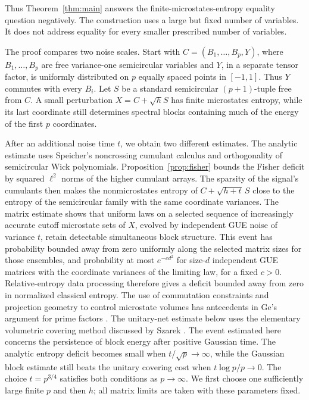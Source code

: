 Thus Theorem~\ref{thm:main} answers the finite-microstates-entropy
equality question negatively. The construction uses a large but fixed number of
variables. It does not address equality for every smaller prescribed
number of variables.

The proof compares two noise scales. Start with
$C=(B_1,\ldots,B_p,Y)$, where $B_1,\ldots,B_p$ are free variance-one
semicircular variables and $Y$, in a separate tensor factor, is uniformly
distributed on $p$ equally spaced points in $[-1,1]$. Thus $Y$ commutes
with every $B_i$. Let $S$ be a standard semicircular $(p+1)$-tuple free
from $C$. A small perturbation $X=C+\sqrt h S$ has finite microstates
entropy, while its last coordinate still determines spectral blocks
containing much of the energy of the first $p$ coordinates.

After an additional noise time $t$, we obtain two different estimates.
The analytic estimate uses Speicher's noncrossing cumulant calculus
\cite{Speicher,NS} and orthogonality of semicircular Wick polynomials.
Proposition~\ref{prop:fisher} bounds the Fisher deficit by squared
$\ell^2$ norms of the higher cumulant arrays. The sparsity of the signal's
cumulants then makes the nonmicrostates entropy of
$C+\sqrt{h+t}\,S$ close to the entropy of the semicircular family with
the same coordinate variances.
The matrix estimate shows that uniform laws on a selected sequence of
increasingly accurate cutoff microstate sets of $X$, evolved by independent
GUE noise of variance $t$, retain detectable simultaneous block structure.
This event has probability bounded away from zero uniformly along
the selected matrix sizes for those ensembles, and probability at most
$e^{-c d^2}$ for size-$d$ independent GUE matrices with the coordinate
variances of the limiting law, for a fixed $c>0$.
Relative-entropy data processing therefore gives a deficit bounded away
from zero in normalized classical entropy. The use of commutation constraints and projection
geometry to control microstate volumes has antecedents in Ge's argument
for prime factors \cite[Lemma~2 and its proof outline]{Ge}.
The unitary-net estimate below uses the elementary volumetric covering
method discussed by Szarek \cite{Szarek}.
The event estimated here concerns the persistence of block energy after
positive Gaussian time. The analytic entropy deficit becomes small when
$t/\sqrt p\to\infty$, while the Gaussian block estimate still beats the
unitary covering cost when $t\log p/p\to0$. The choice $t=p^{3/4}$ satisfies
both conditions as $p\to\infty$. We first choose one sufficiently large
finite $p$ and then $h$; all matrix limits are taken with these parameters fixed.

